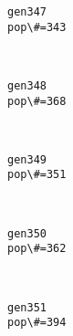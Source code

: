 \documentclass[11pt]{article}
\begin{document}
    \begin{Verbatim}[commandchars=\\\{\}]
gen347
pop\#=343

    \end{Verbatim}

    \begin{center}
    \end{center}
    { \hspace*{\fill} \\}
    
    \begin{Verbatim}[commandchars=\\\{\}]
gen348
pop\#=368

    \end{Verbatim}

    \begin{center}
    \end{center}
    { \hspace*{\fill} \\}
    
    \begin{Verbatim}[commandchars=\\\{\}]
gen349
pop\#=351

    \end{Verbatim}

    \begin{center}
    \end{center}
    { \hspace*{\fill} \\}
    
    \begin{Verbatim}[commandchars=\\\{\}]
gen350
pop\#=362

    \end{Verbatim}

    \begin{center}
    \end{center}
    { \hspace*{\fill} \\}
    
    \begin{Verbatim}[commandchars=\\\{\}]
gen351
pop\#=394

    \end{Verbatim}
\end{document}
